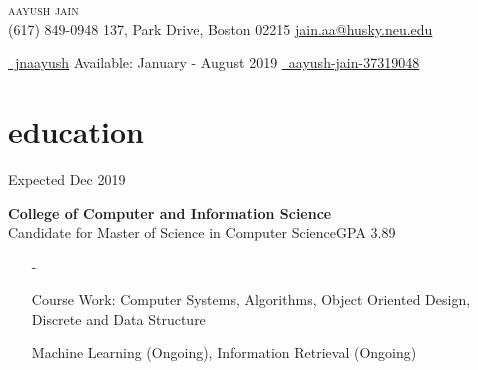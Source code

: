 \documentclass[a4paper, 10pt, oneside]{article}
\begin{document}

\begin{center}
\color{headings}\textsc{\Huge{{aayush jain}}} \\
\vspace{0.0em}
\color{text1}{\Large\Telefon} (617) 849-0948 \hfill \hspace{3.3em}137, Park Drive, Boston 02215 \hfill {\Large\Letter} \href{mailto:jain.aa@husky.neu.edu.com}{jain.aa@husky.neu.edu} 

\vspace{-0.0em}
{\Large\faGithub} \href{https://github.com/jnaayush}{\ jnaayush}
\hfill \hspace{3em} {\selectfont Available: January - August 2019}  
 \hspace{7.8em} {\Large\faLinkedin} \href{https://www.linkedin.com/in/aayush-jain-37319048/}{\ aayush-jain-37319048}

\vspace{-0.3em}
\section{\color{headings} education}
\vspace{-0.5em}
 \hfill {Expected Dec 2019}\\
\raggedright \textbf{College of Computer and Information Science}\\
Candidate for Master of Science in Computer Science\hfill {GPA 3.89}\\
\begin{itemize}
\vspace{-0.7em}
\item[-]\raggedright{Course Work:} Computer Systems, Algorithms, Object Oriented Design, Discrete and Data Structure
\vspace{-0.7em}
\item[] Machine Learning (Ongoing), Information Retrieval (Ongoing) \\
\end{itemize}


\end{center}
\end{document}
